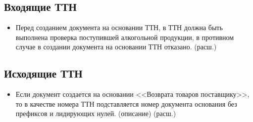 \subsection{Входящие ТТН}

\begin{itemize}
	\item Перед созданием документа на основании ТТН, в ТТН должна быть выполнена проверка поступившей алкогольной продукции, в противном случае в создании документа на основании ТТН отказано.
    (расш.)
\end{itemize}


\subsection{Исходящие ТТН}

\begin{itemize}
	\item Если документ создается на основании <<Возврата товаров поставщику>>, то в качестве номера ТТН подставляется номер документа основания без префиксов и лидирующих нулей.
	(описание)
	(расш.)
\end{itemize}


